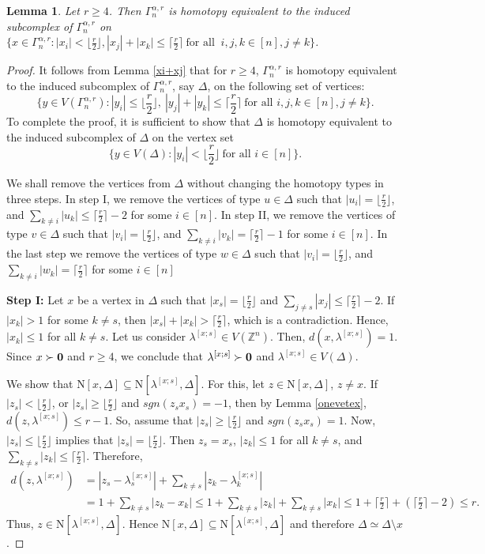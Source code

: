 \documentclass{amsart}
\newtheorem{lemma}[theorem]{Lemma}
\theoremstyle{definition}
\theoremstyle{remark}
\newtheorem{remark}[theorem]{Remark}
\numberwithin{equation}{section}
\newcommand{\D}{\Delta}
\newcommand{\f}{\lfloor\frac{r}{2}\rfloor}
\newcommand{\cil}{\lceil\frac{r}{2}\rceil}
\def\Z{{\mathbb{Z}}}
\def\n{{\mathrm{N}}}
\begin{document}


\begin{lemma}\label{lessthanfloor}
	Let $r\geq 4$. Then $\Gamma_n^{\alpha, r}$ is homotopy equivalent to the induced subcomplex of $\Gamma_n^{\alpha, r}$ on  $\{x\in \Gamma_n^{\alpha, r}: |x_i|< \f,  |x_j|+|x_k|\leq \cil \ \text{for all } \ i,j,k\in [n], j\neq k \}$. 
\end{lemma}
\begin{proof}
	It follows from Lemma \ref{xi+xj} that for $r\geq 4$, $\Gamma_n^{\alpha, r}$ is homotopy equivalent to the induced subcomplex of $\Gamma_n^{\alpha, r}$, say $\D$, on the following set of vertices:
	$$
	\{y \in V(\Gamma_n^{\alpha, r}) : |y_i| \leq \f, \ |y_j| + |y_k| \leq \cil \ \text{for all } i,j,k \in [n], j\neq k\}.
	$$
	To complete the proof, it is sufficient to show that $\D$ is homotopy equivalent to the induced subcomplex of $\D$ on the vertex set
	$$
	\{y \in V(\D) : |y_i| < \f \ \text{for all } i \in [n]\}.
	$$
	
	We shall remove the vertices from $\D$ without changing the homotopy types in three steps. In step I, we remove the vertices of type $u\in \D$ such that $|u_i|=\f$, and $\sum_{k\neq i}|u_k|\leq \cil-2$ for some $i\in [n]$. In step II,  we remove the vertices of type $v\in \D$ such that $|v_i|=\f$, and $\sum_{k\neq i}|v_k|= \cil-1$ for some $i\in [n]$. In the last step we remove the vertices of type $w\in \D$ such that $|v_i|=\f$, and $\sum_{k\neq i}|w_k|= \cil$ for some $i\in [n]$

    \smallskip
	\noindent \textbf{Step I:} Let $x$ be a vertex in $\D$ such that $|x_s| = \f$ and $\sum_{j \neq s} |x_j|\leq \cil - 2$. If $|x_k| > 1$ for some $k \neq s$, then  $|x_s| + |x_k| > \cil$, which is a contradiction. Hence, $|x_k| \leq 1$ for all $k \neq s$. Let us consider $\lambda^{[x;s]}\in V(\Z^n)$. Then, $d(x,\lambda^{[x;s]})=1$. Since $x\succ {\bf{0}}$ and $r\geq 4$, we conclude that $\lambda^{[x;s]}\succ {\bf{0}}$ and $\lambda^{[x;s]}\in V(\D)$. 
	
	
	We show that $\n[x,\D]\subseteq \n[\lambda^{[x;s]},\D]$. For this, let  $z \in \n[x, \D]$,  $z \neq x$. If $|z_s| < \f$, or $|z_s| \geq  \f$ and $sgn(z_s x_s) = -1$, then by Lemma \ref{onevetex}, $d(z, \lambda^{[x;s]}) \leq r - 1$. So, assume that $|z_s| \geq  \f$ and $sgn(z_s x_s) = 1$. Now,  $|z_s| \leq  \f$ implies that $|z_s| = \f$. Then $z_s = x_s$, $|z_k| \leq 1$ for all $k \neq s$, and $\sum_{k \neq s} |z_k| \leq \cil$. Therefore,
	$$
	\begin{aligned}
		d(z, \lambda^{[x;s]}) &= |z_s - \lambda^{[x;s]}_s| + \sum_{k \neq s} |z_k - \lambda^{[x;s]}_k| \\
		&= 1 + \sum_{k \neq s} |z_k - x_k| \leq 1 + \sum_{k \neq s} |z_k| + \sum_{k \neq s} |x_k| \leq 1 + \cil + (\cil - 2) \leq r.
	\end{aligned}
	$$
	Thus, $z \in \n[\lambda^{[x;s]}, \D]$. Hence $\n[x,\D]\subseteq \n[\lambda^{[x;s]},\D]$ and therefore $\D \simeq \D \setminus x$. 
	

\end{proof}
\end{document}
